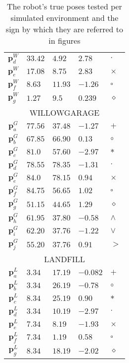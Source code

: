 \begin{table}
\begin{tabular} {c|llll}
    $\bm{p}_d^W$   & $33.42$   & $4.92$    & $2.78$          & $\cdot$   \\
    $\bm{p}_e^W$   & $17.08$   & $8.75$    & $2.83$          & $\times$  \\
    $\bm{p}_f^W$   & $8.63$    & $11.93$   & $-1.26$         & $\square$ \\
    $\bm{p}_g^W$   & $1.27$    & $9.5$     & $0.239$         & $\diamond$\\ \midrule
    \multicolumn{5}{c}{WILLOWGARAGE}                                     \\ \midrule
    $\bm{p}_a^G$   & $77.56$   & $37.48$   & $-1.27$         & $+$       \\
    $\bm{p}_b^G$   & $67.85$   & $66.90$   & $0.13$          & $\circ$   \\
    $\bm{p}_c^G$   & $81.0$    & $57.60$   & $-2.97$         & $\ast$    \\
    $\bm{p}_d^G$   & $78.55$   & $78.35$   & $-1.31$         & $\cdot$   \\
    $\bm{p}_e^G$   & $84.0$    & $78.15$   & $0.94$          & $\times$  \\
    $\bm{p}_f^G$   & $84.75$   & $56.65$   & $1.02$          & $\square$ \\
    $\bm{p}_g^G$   & $51.15$   & $44.65$   & $1.29$          & $\diamond$\\
    $\bm{p}_h^G$   & $61.95$   & $37.80$   & $-0.58$         & $\wedge$  \\
    $\bm{p}_i^G$   & $62.20$   & $37.76$   & $-1.22$         & $\vee$    \\
    $\bm{p}_j^G$   & $55.20$   & $37.76$   & $0.91$          & $>$       \\ \midrule
    \multicolumn{5}{c}{LANDFILL}                                         \\ \midrule
    $\bm{p}_a^L$   & $3.34$    & $17.19$   & $-0.082$        & $+$       \\
    $\bm{p}_b^L$   & $3.34$    & $26.19$   & $-0.78$         & $\circ$   \\
    $\bm{p}_c^L$   & $8.34$    & $25.19$   & $0.90$          & $\ast$    \\
    $\bm{p}_d^L$   & $3.34$    & $10.19$   & $-2.97$         & $\cdot$   \\
    $\bm{p}_e^L$   & $7.34$    & $8.19$    & $-1.93$         & $\times$  \\
    $\bm{p}_f^L$   & $7.34$    & $1.19$    & $0.58$          & $\square$ \\
    $\bm{p}_g^L$   & $8.34$    & $18.19$   & $-2.02$         & $\diamond$\\ \bottomrule
  \end{tabular}
  \caption{\small The robot's true poses tested per simulated environment and
           the sign by which they are referred to in figures}
  \label{tbl:true_poses_simulation}
\end{table}

